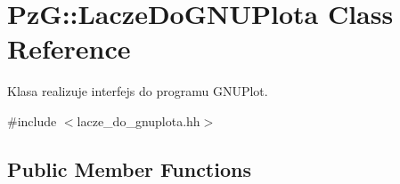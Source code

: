 \hypertarget{class_pz_g_1_1_lacze_do_g_n_u_plota}{}\section{PzG\+:\+:Lacze\+Do\+G\+N\+U\+Plota Class Reference}
\label{class_pz_g_1_1_lacze_do_g_n_u_plota}


Klasa realizuje interfejs do programu G\+N\+U\+Plot.  




{\ttfamily \#include $<$lacze\+\_\+do\+\_\+gnuplota.\+hh$>$}

\subsection*{Public Member Functions}
